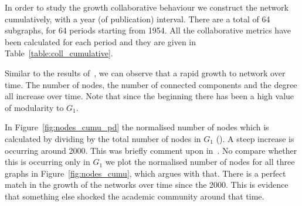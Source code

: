 \documentclass{article}
\theoremstyle{definition}
\newcommand{\authors}{}
\begin{document}
In order to study the growth collaborative behaviour we construct the network
cumulatively, with a year (of publication) interval. There are a total of
64 subgraphs, for 64 periods starting from 1954. All the collaborative metrics
have been calculated for each period and they are given in Table~\ref{table:coll_cumulative}.

Similar to the results of~\cite{Liu2015}, we can observe that a rapid growth to
network over time. The number of nodes, the number of connected components and
the degree all increase over time. Note that since the beginning there has
been a high value of modularity to \(G_1\).

In Figure~\ref{fig:nodes_cumu_pd} the normalised number of nodes which is
calculated by dividing by the total number of nodes in \(G_1\) (\authors).
A steep increase is occurring around 2000. This was briefly comment upon in~\cite{Liu2015}.
No compare whether this is occurring only in \(G_1\) we plot the normalised number
of nodes for all three graphs in Figure~\ref{fig:nodes_cumu}, which argues
with that. There is a perfect match in the growth of the networks over
time since the 2000. This is evidence that something else shocked the academic
community around that time.
\end{document}
